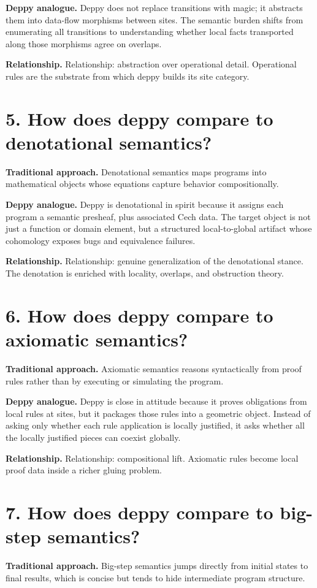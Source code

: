 \documentclass[11pt,openany]{book}
\begin{document}
\textbf{Deppy analogue.} Deppy does not replace transitions with magic; it abstracts them into data-flow morphisms between sites. The semantic burden shifts from enumerating all transitions to understanding whether local facts transported along those morphisms agree on overlaps.

\textbf{Relationship.} Relationship: abstraction over operational detail. Operational rules are the substrate from which deppy builds its site category.

\section*{5. How does deppy compare to denotational semantics?}
\textbf{Traditional approach.} Denotational semantics maps programs into mathematical objects whose equations capture behavior compositionally.

\textbf{Deppy analogue.} Deppy is denotational in spirit because it assigns each program a semantic presheaf, plus associated Cech data. The target object is not just a function or domain element, but a structured local-to-global artifact whose cohomology exposes bugs and equivalence failures.

\textbf{Relationship.} Relationship: genuine generalization of the denotational stance. The denotation is enriched with locality, overlaps, and obstruction theory.

\section*{6. How does deppy compare to axiomatic semantics?}
\textbf{Traditional approach.} Axiomatic semantics reasons syntactically from proof rules rather than by executing or simulating the program.

\textbf{Deppy analogue.} Deppy is close in attitude because it proves obligations from local rules at sites, but it packages those rules into a geometric object. Instead of asking only whether each rule application is locally justified, it asks whether all the locally justified pieces can coexist globally.

\textbf{Relationship.} Relationship: compositional lift. Axiomatic rules become local proof data inside a richer gluing problem.

\section*{7. How does deppy compare to big-step semantics?}
\textbf{Traditional approach.} Big-step semantics jumps directly from initial states to final results, which is concise but tends to hide intermediate program structure.
\end{document}
